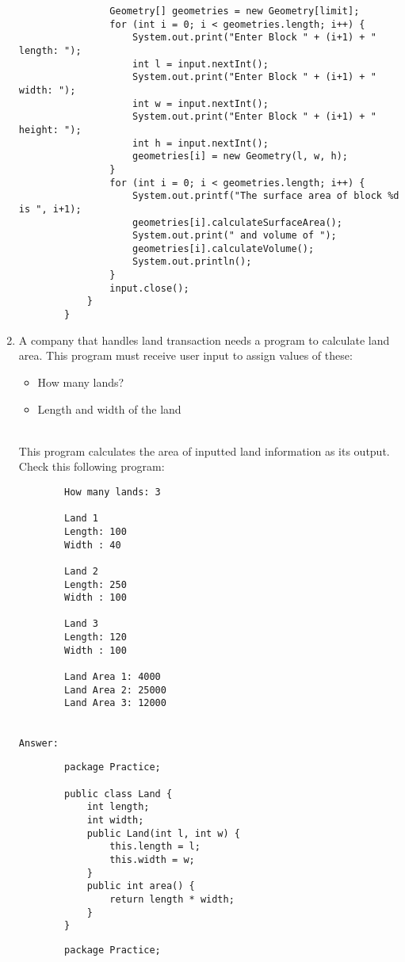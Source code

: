 \documentclass[12pt,titlepage]{article}
\begin{document}
\begin{enumerate}
\begin{verbatim}
                Geometry[] geometries = new Geometry[limit];
                for (int i = 0; i < geometries.length; i++) {
                    System.out.print("Enter Block " + (i+1) + " length: ");
                    int l = input.nextInt();
                    System.out.print("Enter Block " + (i+1) + " width: ");
                    int w = input.nextInt();
                    System.out.print("Enter Block " + (i+1) + " height: ");
                    int h = input.nextInt();
                    geometries[i] = new Geometry(l, w, h);
                }
                for (int i = 0; i < geometries.length; i++) {
                    System.out.printf("The surface area of block %d is ", i+1);
                    geometries[i].calculateSurfaceArea();
                    System.out.print(" and volume of ");
                    geometries[i].calculateVolume();
                    System.out.println();
                }
                input.close();
            }
        }
    \end{verbatim}
    \item A company that handles land transaction needs a program to calculate land area. This program must receive user input to assign values of these:
    \begin{itemize}
        \item How many lands?
        \item Length and width of the land
    \end{itemize}
    \mbox{}\\ This program calculates the area of inputted land information as its output. Check this following program:
    \begin{verbatim}
        How many lands: 3

        Land 1
        Length: 100
        Width : 40

        Land 2
        Length: 250
        Width : 100

        Land 3
        Length: 120
        Width : 100

        Land Area 1: 4000
        Land Area 2: 25000
        Land Area 3: 12000
    \end{verbatim}
    \mbox{}\\ \texttt{Answer:}
    \begin{verbatim}
        package Practice;

        public class Land {
            int length;
            int width;
            public Land(int l, int w) {
                this.length = l;
                this.width = w;
            }
            public int area() {
                return length * width;
            }
        }
    \end{verbatim}
    \begin{verbatim}
        package Practice;


\end{verbatim}
\end{enumerate}
\end{document}
